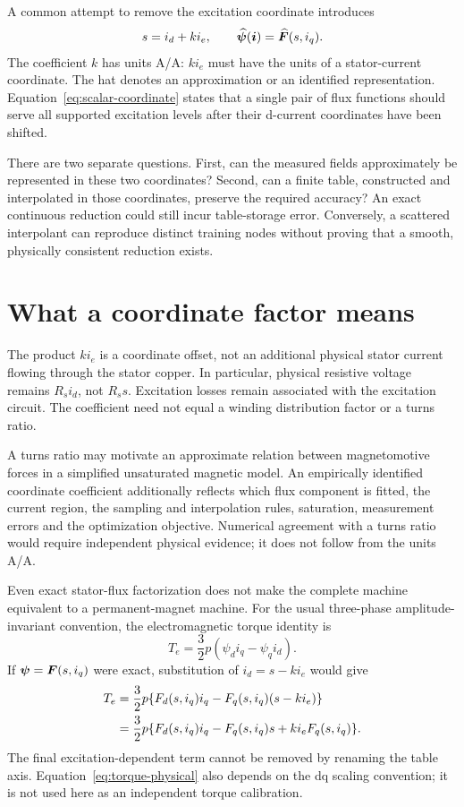 A common attempt to remove the excitation coordinate introduces
\begin{equation}\label{eq:scalar-coordinate}
s=i_d+k i_e,\qquad
\widehat{\bm\psi}(\bm i)=\widehat{\bm F}(s,i_q).
\end{equation}
The coefficient $k$ has units A/A: $k i_e$ must have the units of a stator-current coordinate. The hat denotes an approximation or an identified representation. Equation~\eqref{eq:scalar-coordinate} states that a single pair of flux functions should serve all supported excitation levels after their d-current coordinates have been shifted.

There are two separate questions. First, can the measured fields approximately be represented in these two coordinates? Second, can a finite table, constructed and interpolated in those coordinates, preserve the required accuracy? An exact continuous reduction could still incur table-storage error. Conversely, a scattered interpolant can reproduce distinct training nodes without proving that a smooth, physically consistent reduction exists.

\section{What a coordinate factor means}
The product $k i_e$ is a coordinate offset, not an additional physical stator current flowing through the stator copper. In particular, physical resistive voltage remains $R_s i_d$, not $R_s s$. Excitation losses remain associated with the excitation circuit. The coefficient need not equal a winding distribution factor or a turns ratio.

A turns ratio may motivate an approximate relation between magnetomotive forces in a simplified unsaturated magnetic model. An empirically identified coordinate coefficient additionally reflects which flux component is fitted, the current region, the sampling and interpolation rules, saturation, measurement errors and the optimization objective. Numerical agreement with a turns ratio would require independent physical evidence; it does not follow from the units A/A.

Even exact stator-flux factorization does not make the complete machine equivalent to a permanent-magnet machine. For the usual three-phase amplitude-invariant convention, the electromagnetic torque identity is
\begin{equation}\label{eq:torque-physical}
T_e=\frac32p(\psi_d i_q-\psi_q i_d).
\end{equation}
If $\bm\psi=\bm F(s,i_q)$ were exact, substitution of $i_d=s-k i_e$ would give
\begin{align}
T_e&=\frac32p\{F_d(s,i_q)i_q-F_q(s,i_q)(s-k i_e)\}\notag\\
&=\frac32p\{F_d(s,i_q)i_q-F_q(s,i_q)s+k i_eF_q(s,i_q)\}.
\end{align}
The final excitation-dependent term cannot be removed by renaming the table axis. Equation~\eqref{eq:torque-physical} also depends on the dq scaling convention; it is not used here as an independent torque calibration.

